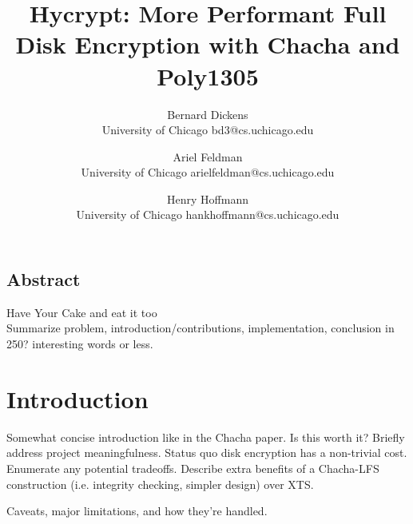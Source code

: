 \documentclass[letterpaper,twocolumn,10pt]{article}
\begin{document}
\date{}

\title{\Large \bf Hycrypt: More Performant Full Disk Encryption with Chacha and Poly1305}

\author{
{\rm Bernard Dickens}\\
University of Chicago
bd3@cs.uchicago.edu
\and
{\rm Ariel Feldman}\\
University of Chicago
arielfeldman@cs.uchicago.edu
\and
{\rm Henry Hoffmann}\\
University of Chicago
hankhoffmann@cs.uchicago.edu
} %

\maketitle

\thispagestyle{empty}


\subsection*{Abstract}
Have Your Cake and eat it too \\
Summarize problem, introduction/contributions, implementation, conclusion in 250? interesting words or less.

\section{Introduction}
Somewhat concise introduction like in the Chacha paper. Is this worth it? Briefly address project meaningfulness.
Status quo disk encryption has a non-trivial cost. Enumerate any potential tradeoffs. Describe extra benefits of a
Chacha-LFS construction (i.e. integrity checking, simpler design) over XTS.

Caveats, major limitations, and how they're handled.
\end{document}
